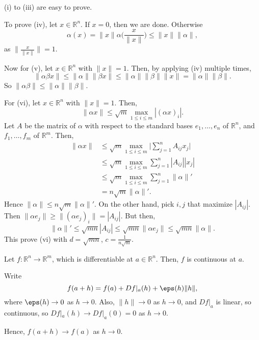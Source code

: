 \documentclass[12pt]{article}
\begin{document}
\begin{proofbox}
	(i) to (iii) are easy to prove.

	To prove (iv), let $x \in \mathbb{R}^{n}$. If $x = 0$, then we are done. Otherwise
	\[
	\alpha(x) = \|x\| \alpha \biggl( \frac{x}{\|x\|}\biggr) \leq \|x\| \|\alpha\|
	,\]
	as $\| \frac{x}{\|x\|} \| = 1$.

	Now for (v), let $x \in \mathbb{R}^{n}$ with $\|x\| = 1$. Then, by applying (iv) multiple times,
	\[
	\|\alpha \beta x\| \leq \|\alpha\| \|\beta x\| \leq \|\alpha \| \|\beta \| \|x\| = \|\alpha\|\|\beta\|
	.\]
	So $\|\alpha \beta \| \leq \|\alpha \| \|\beta \|$.

	For (vi), let $x \in \mathbb{R}^{n}$ with $\|x\| = 1$. Then,
	\[
	\|\alpha x\| \leq \sqrt m \max_{1 \leq i \leq m} | (\alpha x)_{i} |
	.\]
	Let $A$ be the matrix of $\alpha$ with respect to the standard bases $e_1, \ldots, e_n$ of $\mathbb{R}^{n}$, and $f_1, \ldots, f_m$ of $\mathbb{R}^{m}$. Then,
	\begin{align*}
	\|\alpha x\| &\leq \sqrt m \max_{1 \leq i \leq m} \biggl| \sum_{j = 1}^{n} A_{ij} x_j \biggr| \\
		     &\leq \sqrt m \max_{1 \leq i \leq m} \sum_{j = 1}^{n} |A_{ij}| |x_j| \\
		     &\leq \sqrt m \max_{1 \leq i \leq m} \sum_{j = 1}^{n} \|\alpha\|' \\
		     &= n \sqrt m \|\alpha\|'.
	\end{align*}
	Hence $\|\alpha\| \leq n \sqrt m \|\alpha\|'$. On the other hand, pick $i, j$ that maximize $|A_{ij}|$. Then $\|\alpha e_j\| \geq \|(\alpha e_j)_i\| = |A_{ij}|$. But then,
	\[
		\|\alpha\|' \leq \sqrt{mn} |A_{ij}| \leq \sqrt{mn} \|\alpha e_j\| \leq \sqrt{mn} \|\alpha\|
	.\]
	This prove (vi) with $d = \sqrt{mn}$, $c = \frac{1}{n\sqrt m}$.
\end{proofbox}

\begin{proposition}
	Let $f : \mathbb{R}^{n} \to \mathbb{R}^{m}$, which is differentiable at $a \in \mathbb{R}^{n}$. Then, $f$ is continuous at $a$.
\end{proposition}

\begin{proofbox}
	Write
	\[
	f(a + h) = f(a) + Df|_{a}(h) + \eps(h) \|h\|
	,\]
	where $\eps(h) \to 0$ as $h \to 0$. Also, $\|h\| \to 0$ as $h \to 0$, and $Df|_{a}$ is linear, so continuous, so $Df|_{a}(h) \to Df|_{a}(0) = 0$ as $h \to 0$.

	Hence, $f(a + h) \to f(a)$ as $h \to 0$.
\end{proofbox}
\end{document}

